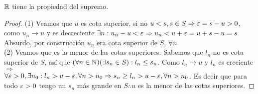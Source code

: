\begin{theorem}
	\(\mathbb{R} \) tiene la propiedad del supremo.
	\begin{proof}

		(1) Veamos que \(u\) es cota superior, si no \(u < s, s \in S \Rightarrow \varepsilon = s - u > 0\), como \(u_n \to u\) y es decreciente \(\exists n : u_n - u < \varepsilon \Rightarrow u_n < u + \varepsilon = u + s - u = s\) Absurdo, por construcción \(u_n\) era cota superior de \(S \), \( \forall n\). \\
		(2) Veamos que es la menor de las cotas superiores. Sabemos que \(l_n\) no es cota superior de \(S\), así que \((\forall n \in \mathbb{N})(\exists s_n \in S) : l_n \leq s_n\). Como \(l_n \to u\) y \(l_n\) es creciente \(\Rightarrow \) \\
		\(\forall \varepsilon > 0, \exists n_0 : l_n > u - \varepsilon, \forall n>n_0 \Rightarrow s_n \geq l_n > u - \varepsilon, \forall n > n_0\). Es decir que para todo \(\varepsilon > 0\) tengo un \(s_n\) más grande en \(S \therefore u\) es la menor de las cotas superiores.
	\end{proof}
\end{theorem}

